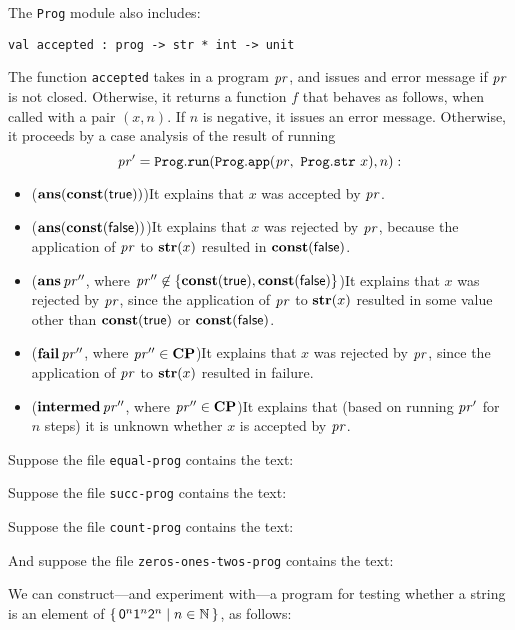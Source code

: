 The \texttt{Prog} module also includes:
\begin{verbatim}
val accepted : prog -> str * int -> unit
\end{verbatim}
%
The function \texttt{accepted} takes in a program $\mathit{pr}$, and issues
and error message if $\mathit{pr}$ is not closed.  Otherwise, it returns
a function $f$ that behaves as follows, when called with a pair
$(x, n)$.  If $n$ is negative, it issues an error message.  Otherwise,
it proceeds by a case analysis of the result of running
\begin{displaymath}
  \mathit{pr}' = \mathtt{Prog.run}(\mathtt{Prog.app}(\mathit{pr},~\mathtt{Prog.str}~x), n) :
\end{displaymath}
\begin{itemize}
\item ($\mathbf{ans}(\mathbf{const}(\mathsf{true}))$)\quad It explains that
  $x$ was accepted by $\mathit{pr}$.

\item ($\mathbf{ans}(\mathbf{const}(\mathsf{false}))$)\quad It explains that $x$ was
  rejected by $\mathit{pr}$, because the application of $\mathit{pr}$ to $\mathbf{str}(x)$
  resulted in $\mathbf{const}(\mathsf{false})$.

\item ($\mathbf{ans}\,\mathit{pr}''$, where $\mathit{pr}''\not\in\{\mathbf{const}(\mathsf{true}),
  \mathbf{const}(\mathsf{false})\}$)\quad It explains that $x$ was rejected by
  $\mathit{pr}$, since the application of $\mathit{pr}$ to $\mathbf{str}(x)$ resulted in
  some value other than $\mathbf{const}(\mathsf{true})$ or
  $\mathbf{const}(\mathsf{false})$.

\item ($\mathbf{fail}\,\mathit{pr}''$, where $\mathit{pr}''\in\mathbf{CP}$)\quad It explains that $x$
  was rejected by $\mathit{pr}$, since the application of $\mathit{pr}$ to
  $\mathbf{str}(x)$ resulted in failure.

\item ($\mathbf{intermed}\,\mathit{pr}''$, where $\mathit{pr}''\in\mathbf{CP}$)\quad It explains that
  (based on running $\mathit{pr}'$ for $n$ steps) it is unknown whether $x$ is
  accepted by $\mathit{pr}$.
\end{itemize}

Suppose the file \texttt{equal-prog} contains the text:

Suppose the file \texttt{succ-prog} contains the text:

Suppose the file \texttt{count-prog} contains the text:

And suppose the file \texttt{zeros-ones-twos-prog} contains the
text:

We can construct---and experiment with---a program for testing whether
a string is an element of
$\{ \, \mathsf{0}^n\mathsf{1}^n\mathsf{2}^n \mid n\in\mathbb{N} \, \}$, as follows:


